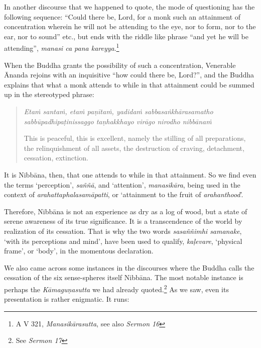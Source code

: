 In another discourse that we happened to quote, the mode of questioning has the following sequence: ``Could there be, Lord, for a monk such an attainment of concentration wherein he will not be attending to the eye, nor to form, nor to the ear, nor to sound'' etc., but ends with the riddle like phrase ``and yet he will be attending'', \emph{manasi ca pana kareyya}.\footnote{A V 321, \emph{Manasikārasutta}, see also \emph{Sermon 16}}

When the Buddha grants the possibility of such a concentration, Venerable Ānanda rejoins with an inquisitive ``how could there be, Lord?'', and the Buddha explains that what a monk attends to while in that attainment could be summed up in the stereotyped phrase:

\begin{quote}
\emph{Etaṁ santaṁ, etaṁ paṇītaṁ, yadidaṁ sabbasaṅkhārasamatho sabbūpadhipaṭinissaggo taṇhakkhayo virāgo nirodho nibbānaṁ}

This is peaceful, this is excellent, namely the stilling of all preparations, the relinquishment of all assets, the destruction of craving, detachment, cessation, extinction.
\end{quote}

It is Nibbāna, then, that one attends to while in that attainment. So we find even the terms `perception', \emph{saññā}, and `attention', \emph{manasikāra}, being used in the context of \emph{arahattaphalasamāpatti}, or `attainment to the fruit of \emph{arahanthood}'.

Therefore, Nibbāna is not an experience as dry as a log of wood, but a state of serene awareness of its true significance. It is a transcendence of the world by realization of its cessation. That is why the two words \emph{sasaññimhi samanake}, `with its perceptions and mind', have been used to qualify, \emph{kaḷevare}, `physical frame', or `body', in the momentous declaration.

We also came across some instances in the discourses where the Buddha calls the cessation of the six sense-spheres itself Nibbāna. The most notable instance is perhaps the \emph{Kāmaguṇasutta} we had already quoted.\footnote{See \emph{Sermon 17}} As we saw, even its presentation is rather enigmatic. It runs:

